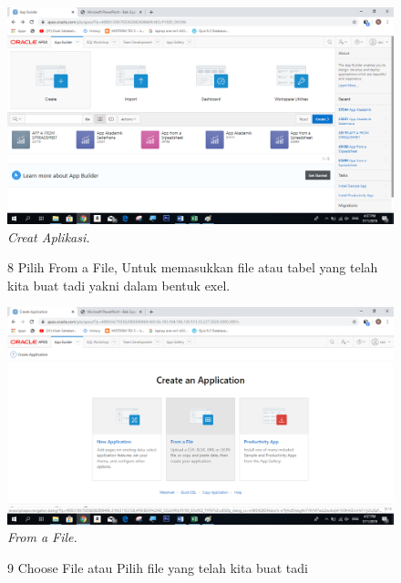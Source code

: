 \begin{enumerate}
\begin{figure}
    \begin{center}
    \includegraphics[scale=0.4]{figures/7.png}
    \caption{\textit{Creat Aplikasi.}}
    \end{center}
    \label{gambar}
    \end{figure}

\begin{figure}
\item[8]Pilih From a File, Untuk memasukkan file atau tabel yang telah kita buat tadi yakni dalam bentuk exel.

    \begin{center}
    \includegraphics[scale=0.4]{figures/8.png}
    \caption{\textit{From a File.}}
    \end{center}
    \label{gambar}
    \end{figure}

\begin{figure}
\item[9]Choose File atau Pilih file yang telah kita buat tadi


\end{figure}
\end{enumerate}
